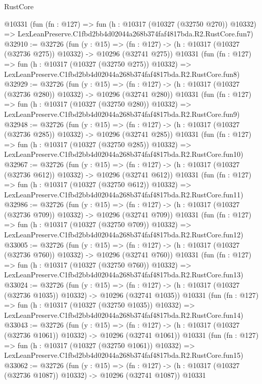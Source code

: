 \begin{lexlean}{RustCore}
\begin{coremodule}
    @10331
    (fun (fn : @127) =>
    fun (h : @10317 (@10327 (@32750 @270)) @10332) =>
    LexLeanPreserve.C1fbd2bb4d02044a268b374faf4817bda.R2.RustCore.fun7)
@32910 := @32726
    (fun (y : @15) =>
    (fn : @127) -> (h : @10317 (@10327 (@32736 @275)) @10332) -> @10296 (@32741 @275))
    @10331
    (fun (fn : @127) =>
    fun (h : @10317 (@10327 (@32750 @275)) @10332) =>
    LexLeanPreserve.C1fbd2bb4d02044a268b374faf4817bda.R2.RustCore.fun8)
@32929 := @32726
    (fun (y : @15) =>
    (fn : @127) -> (h : @10317 (@10327 (@32736 @280)) @10332) -> @10296 (@32741 @280))
    @10331
    (fun (fn : @127) =>
    fun (h : @10317 (@10327 (@32750 @280)) @10332) =>
    LexLeanPreserve.C1fbd2bb4d02044a268b374faf4817bda.R2.RustCore.fun9)
@32948 := @32726
    (fun (y : @15) =>
    (fn : @127) -> (h : @10317 (@10327 (@32736 @285)) @10332) -> @10296 (@32741 @285))
    @10331
    (fun (fn : @127) =>
    fun (h : @10317 (@10327 (@32750 @285)) @10332) =>
    LexLeanPreserve.C1fbd2bb4d02044a268b374faf4817bda.R2.RustCore.fun10)
@32967 := @32726
    (fun (y : @15) =>
    (fn : @127) -> (h : @10317 (@10327 (@32736 @612)) @10332) -> @10296 (@32741 @612))
    @10331
    (fun (fn : @127) =>
    fun (h : @10317 (@10327 (@32750 @612)) @10332) =>
    LexLeanPreserve.C1fbd2bb4d02044a268b374faf4817bda.R2.RustCore.fun11)
@32986 := @32726
    (fun (y : @15) =>
    (fn : @127) -> (h : @10317 (@10327 (@32736 @709)) @10332) -> @10296 (@32741 @709))
    @10331
    (fun (fn : @127) =>
    fun (h : @10317 (@10327 (@32750 @709)) @10332) =>
    LexLeanPreserve.C1fbd2bb4d02044a268b374faf4817bda.R2.RustCore.fun12)
@33005 := @32726
    (fun (y : @15) =>
    (fn : @127) -> (h : @10317 (@10327 (@32736 @760)) @10332) -> @10296 (@32741 @760))
    @10331
    (fun (fn : @127) =>
    fun (h : @10317 (@10327 (@32750 @760)) @10332) =>
    LexLeanPreserve.C1fbd2bb4d02044a268b374faf4817bda.R2.RustCore.fun13)
@33024 := @32726
    (fun (y : @15) =>
    (fn : @127) -> (h : @10317 (@10327 (@32736 @1035)) @10332) -> @10296 (@32741 @1035))
    @10331
    (fun (fn : @127) =>
    fun (h : @10317 (@10327 (@32750 @1035)) @10332) =>
    LexLeanPreserve.C1fbd2bb4d02044a268b374faf4817bda.R2.RustCore.fun14)
@33043 := @32726
    (fun (y : @15) =>
    (fn : @127) -> (h : @10317 (@10327 (@32736 @1061)) @10332) -> @10296 (@32741 @1061))
    @10331
    (fun (fn : @127) =>
    fun (h : @10317 (@10327 (@32750 @1061)) @10332) =>
    LexLeanPreserve.C1fbd2bb4d02044a268b374faf4817bda.R2.RustCore.fun15)
@33062 := @32726
    (fun (y : @15) =>
    (fn : @127) -> (h : @10317 (@10327 (@32736 @1087)) @10332) -> @10296 (@32741 @1087))
    @10331

\end{coremodule}
\end{lexlean}
